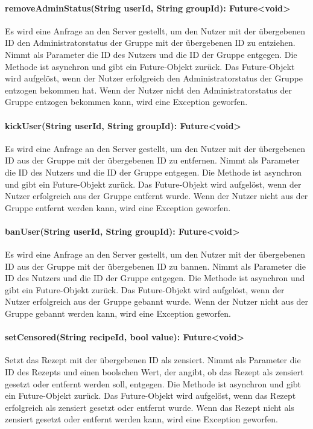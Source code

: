 \documentclass[parskip=full]{scrartcl}
\begin{document}
\paragraph{removeAdminStatus(String userId, String groupId): Future<void>}
Es wird eine Anfrage an den Server gestellt, um den Nutzer mit der übergebenen ID den Administratorstatus der Gruppe mit der übergebenen ID zu entziehen. Nimmt als Parameter die ID des Nutzers und die ID der Gruppe entgegen. Die Methode ist asynchron und gibt ein Future-Objekt zurück. Das Future-Objekt wird aufgelöst, wenn der Nutzer erfolgreich den Administratorstatus der Gruppe entzogen bekommen hat. Wenn der Nutzer nicht den Administratorstatus der Gruppe entzogen bekommen kann, wird eine Exception geworfen.
\paragraph{kickUser(String userId, String groupId): Future<void>}
Es wird eine Anfrage an den Server gestellt, um den Nutzer mit der übergebenen ID aus der Gruppe mit der übergebenen ID zu entfernen. Nimmt als Parameter die ID des Nutzers und die ID der Gruppe entgegen. Die Methode ist asynchron und gibt ein Future-Objekt zurück. Das Future-Objekt wird aufgelöst, wenn der Nutzer erfolgreich aus der Gruppe entfernt wurde. Wenn der Nutzer nicht aus der Gruppe entfernt werden kann, wird eine Exception geworfen.
\paragraph{banUser(String userId, String groupId): Future<void>}
Es wird eine Anfrage an den Server gestellt, um den Nutzer mit der übergebenen ID aus der Gruppe mit der übergebenen ID zu bannen. Nimmt als Parameter die ID des Nutzers und die ID der Gruppe entgegen. Die Methode ist asynchron und gibt ein Future-Objekt zurück. Das Future-Objekt wird aufgelöst, wenn der Nutzer erfolgreich aus der Gruppe gebannt wurde. Wenn der Nutzer nicht aus der Gruppe gebannt werden kann, wird eine Exception geworfen.
\paragraph{setCensored(String recipeId, bool value): Future<void>}
Setzt das Rezept mit der übergebenen ID als zensiert. Nimmt als Parameter die ID des Rezepts und einen boolschen Wert, der angibt, ob das Rezept als zensiert gesetzt oder entfernt werden soll, entgegen. Die Methode ist asynchron und gibt ein Future-Objekt zurück. Das Future-Objekt wird aufgelöst, wenn das Rezept erfolgreich als zensiert gesetzt oder entfernt wurde. Wenn das Rezept nicht als zensiert gesetzt oder entfernt werden kann, wird eine Exception geworfen.
\end{document}
